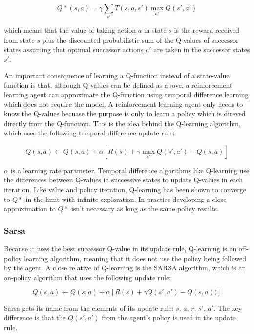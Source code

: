\begin{equation}
Q*(s, a) = \gamma \sum_{s'} T(s, a, s') \max_{a'} Q(s', a')
\end{equation}

which means that the value of taking action $a$ in state $s$ is the reward received from state $s$ plus the discounted probabilistic sum of the Q-values of successor states assuming that optimal successor actions $a'$ are taken in the successor states $s'$.

An important consequence of learning a Q-function instead of a state-value function is that, although Q-values can be defined as above, a reinforcement learning agent can approximate the Q-function using temporal difference learning which does not require the model. A reinforcement learning agent only needs to know the Q-values becuase the purpose is only to learn a policy which is direved directly from the Q-function. This is the idea behind the Q-learning algorithm, which uses the following temporal difference update rule:

\begin{equation}
Q(s, a) \leftarrow Q(s, a) + \alpha [R(s) + \gamma \max_{a'} Q(s', a') - Q(s, a)]
\end{equation}

$\alpha$ is a learning rate parameter. Temporal difference algorithms like Q-learning use the differences between Q-values in successive states to update Q-values in each iteration. Like value and policy iteration, Q-learning has been shown to converge to $Q*$ in the limit with infinite exploration. In practice developing a close approximation to $Q*$ isn't necessary as long as the same policy results.

\subsubsection{Sarsa}

Because it uses the best successor Q-value in its update rule, Q-learning is an off-policy learning algorithm, meaning that it does not use the policy being followed by the agent. A close relative of Q-learning is the SARSA algorithm, which is an on-policy algorithm that uses the following update rule:

\begin{equation}
Q(s, a) \leftarrow Q(s, a) + \alpha [R(s) + \gamma Q(s', a') - Q(s, a))]
\end{equation}

Sarsa gets its name from the elements of its update rule: $s$, $a$, $r$, $s'$, $a'$. The key difference is that the $Q(s', a')$ from the agent's policy is used in the update rule.

